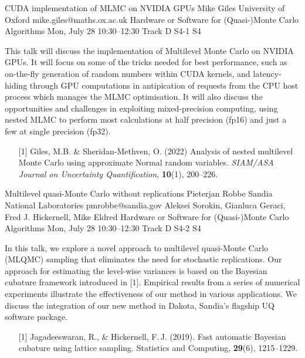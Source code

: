 \begin{talk}
  {CUDA implementation of MLMC on NVIDIA GPUs}%
  {Mike Giles}%
  {University of Oxford}%
  {mike.giles@maths.ox.ac.uk}%
  {Hardware or Software for (Quasi-)Monte Carlo Algorithms}%
  {}%
  {Mon, July 28 10:30–12:30 Track D}%
  {S4-1}%
  {S4}%
				
			

This talk will discuss the implementation of Multilevel Monte Carlo
on NVIDIA GPUs.  It will focus on some of the tricks needed for best
performance, such as on-the-fly generation of random numbers within
CUDA kernels, and latency-hiding through GPU computations in antipication
of requests from the CPU host process which manages the MLMC optimisation.
It will also discuss the opportunities and challenges in exploiting
mixed-precision computing, using nested MLMC to perform most calculations
at half precision (fp16) and just a few at single precision (fp32).

\medskip

\begin{enumerate}
\item[{[1]}] Giles, M.B. \& Sheridan-Methven, O. (2022)
  Analysis of nested multilevel Monte Carlo using approximate
  Normal random variables. {\it SIAM/ASA
Journal on Uncertainty Quantification}, \textbf{10}(1), 200--226.
\end{enumerate}

\end{talk}

\begin{talk}
  {Multilevel quasi-Monte Carlo without replications}%
  {Pieterjan Robbe}%
  {Sandia National Laboratories}%
  {pmrobbe@sandia.gov}%
  {Aleksei Sorokin, Gianluca Geraci, Fred J. Hickernell, Mike Eldred}%
  {Hardware or Software for (Quasi-)Monte Carlo Algorithms}%
  {Mon, July 28 10:30–12:30 Track D}%
  {S4-2}%
  {S4}%
				
			
In this talk, we explore a novel approach to multilevel quasi-Monte Carlo (MLQMC) sampling that eliminates the need for stochastic replications. Our approach for estimating the level-wise variances is based on the Bayesian cubature framework introduced in [1]. Empirical results from a series of numerical experiments illustrate the effectiveness of our method in various applications. We discuss the integration of our new method in Dakota, Sandia's flagship UQ software package.

\medskip

\begin{enumerate}
  \item[{[1]}] Jagadeeswaran, R., \& Hickernell, F.\,J. (2019). Fast automatic Bayesian cubature using lattice sampling. Statistics and Computing, \textbf{29}(6), 1215--1229.
\end{enumerate}

\end{talk}

